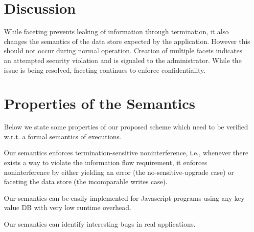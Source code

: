 \section{Discussion}

While faceting prevents leaking of information through termination, it 
also changes the semantics of the data store expected by the 
application.  However this should not occur during normal operation.  
Creation of multiple facets indicates an attempted security violation 
and is signaled to the administrator. While the issue is being 
resolved, faceting continues to enforce confidentiality.


\section{Properties of the Semantics}

Below we state some properties of our proposed scheme which need to be verified w.r.t.
a formal semantics of executions.

\begin{conj}
Our semantics enforces termination-sensitive noninterference, i.e., whenever there exists
a way to violate the information flow requirement, it enforces noninterference by either yielding an error (the no-sensitive-upgrade case)
or faceting the data store (the incomparable writes case).
\end{conj}

\begin{conj}
Our semantics can be easily implemented for Javascript programs using
any key value DB with very low runtime overhead.
\end{conj}

\begin{conj}
Our semantics can identify interesting bugs in real applications.
\end{conj}

